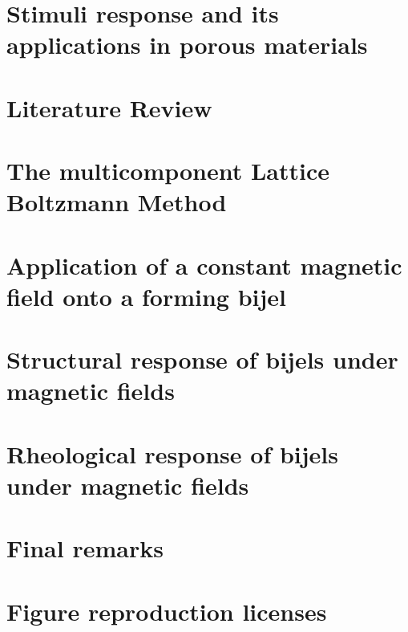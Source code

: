 \documentclass{udthesis}
\begin{document}


\chapter{Stimuli response and its applications in porous materials}
\label{chapter:introduction}


\chapter{Literature Review}
\label{chapter:lit_review}


\chapter{The multicomponent Lattice Boltzmann Method}
\label{chapter:methods_chapter}




\chapter{Application of a constant magnetic field onto a forming bijel}
\label{chapter:aim1}


\chapter{Structural response of bijels under magnetic fields}
\label{chapter:aim2}


\chapter{Rheological response of bijels under magnetic fields}
\label{chapter:aim3}


\chapter{Final remarks}
\label{chapter:final_remarks}


\newpage

\chapter{Figure reproduction licenses}


\newpage



\end{document}
